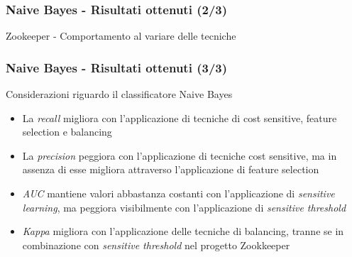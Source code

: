 \documentclass[
	usepdftitle=false,
	xcolor={table, dvipsnames},
	hyperref={
		pdftitle={Machine Learning per Software Engineering},
    	pdfauthor={Alessando Chillotti}
    }
]{beamer}
\begin{document}
\begin{frame}
\frametitle{Naive Bayes - Risultati ottenuti (2/3)}
\begin{block}{Zookeeper - Comportamento al variare delle tecniche}
\begin{figure}[ht!]
\end{figure}
\end{block}
\end{frame}

\begin{frame}
\frametitle{Naive Bayes - Risultati ottenuti (3/3)}
\begin{block}{Considerazioni riguardo il classificatore Naive Bayes}
\begin{itemize}
\item La \textit{recall} migliora con l'applicazione di tecniche di cost sensitive, feature selection e balancing
\item La \textit{precision} peggiora con l'applicazione di tecniche cost sensitive, ma in assenza di esse migliora attraverso l'applicazione di feature selection
\item \textit{AUC} mantiene valori abbastanza costanti con l'applicazione di \textit{sensitive learning}, ma peggiora visibilmente con l'applicazione di \textit{sensitive threshold}
\item \textit{Kappa} migliora con l'applicazione delle tecniche di balancing, tranne se in combinazione con \textit{sensitive threshold} nel progetto Zookkeeper
\end{itemize}
\end{block}
\end{frame}
\end{document}
